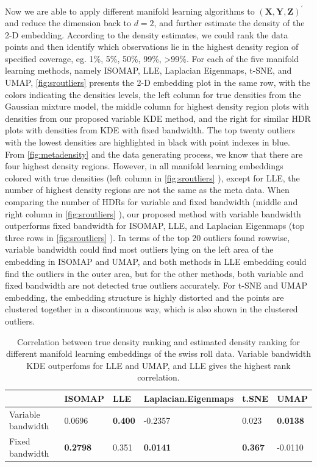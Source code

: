 \documentclass[11pt,a4paper,]{article}
\begin{document}
Now we are able to apply different manifold learning algorithms to \((\pmb{X}, \pmb{Y}, \pmb{Z})^\prime\) and reduce the dimension back to \(d=2\), and further estimate the density of the 2-D embedding. According to the density estimates, we could rank the data points and then identify which observations lie in the highest density region of specified coverage, eg. 1\%, 5\%, 50\%, 99\%, \textgreater99\%. For each of the five manifold learning methods, namely ISOMAP, LLE, Laplacian Eigenmaps, t-SNE, and UMAP, \autoref{fig:sroutliers} presents the 2-D embedding plot in the same row, with the colors indicating the densities levels, the left column for true densities from the Gaussian mixture model, the middle column for highest density region plots with densities from our proposed variable KDE method, and the right for similar HDR plots with densities from KDE with fixed bandwidth. The top twenty outliers with the lowest densities are highlighted in black with point indexes in blue.
From \autoref{fig:metadensity} and the data generating process, we know that there are four highest density regions. However, in all manifold learning embeddings colored with true densities (left column in \autoref{fig:sroutliers} ), except for LLE, the number of highest density regions are not the same as the meta data. When comparing the number of HDRs for variable and fixed bandwidth (middle and right column in \autoref{fig:sroutliers} ), our proposed method with variable bandwidth outperforms fixed bandwidth for ISOMAP, LLE, and Laplacian Eigenmaps (top three rows in \autoref{fig:sroutliers} ).
In terms of the top 20 outliers found rowwise, variable bandwidth could find most outliers lying on the left area of the embedding in ISOMAP and UMAP, and both methods in LLE embedding could find the outliers in the outer area, but for the other methods, both variable and fixed bandwidth are not detected true outliers accurately. For t-SNE and UMAP embedding, the embedding structure is highly distorted and the points are clustered together in a discontinuous way, which is also shown in the clustered outliers.

\begin{table}

\caption{\label{tab:srcors}Correlation between true density ranking and estimated density ranking for different manifold learning embeddings of the swiss roll data. Variable bandwidth KDE outperfoms for LLE and UMAP, and LLE gives the highest rank correlation.}
\centering
\begin{tabular}[t]{l>{}l>{}l>{}l>{}l>{}l}
\toprule
  & ISOMAP & LLE & Laplacian.Eigenmaps & t.SNE & UMAP\\
\midrule
Variable bandwidth & 0.0696 & \textbf{0.400} & -0.2357 & 0.023 & \textbf{0.0138}\\
Fixed bandwidth & \textbf{0.2798} & 0.351 & \textbf{0.0141} & \textbf{0.367} & -0.0110\\
\bottomrule
\end{tabular}
\end{table}
\end{document}

